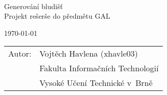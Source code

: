 %
%

\begin{titlepage}

\vfill~

\begin{center}
  \bigskip
  {\Huge Generování bludišť\\}
  {\Large Projekt rešerše do předmětu GAL\\}
\end{center}

\vfill

\begin{center}
  {\Large \today }
\end{center}

\vfill

\begin{flushleft}
  {\large 
  \begin{tabular}{ll}
    Autor: & Vojtěch Havlena (xhavle03) \\
    & Fakulta Informačních Technologií \\
    & Vysoké Učení Technické v~Brně \\
    \end{tabular} }
\end{flushleft}
\end{titlepage}
